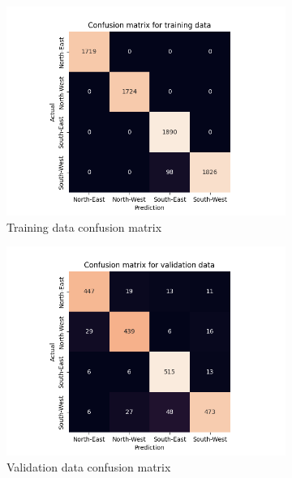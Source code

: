 \documentclass[10pt,twocolumn,letterpaper]{article}
\begin{document}
\begin{figure}[h]
  \centering
  \begin{subfigure}{.33\linewidth}
    \includegraphics[width=\linewidth, trim={7em, 0em, 9em, 5em}, clip]{cnn_aug_cfsn_train}
    \caption{Training data confusion matrix}
    \label{fig:cnn_train}
  \end{subfigure}
  \begin{subfigure}{0.33\linewidth}
    \includegraphics[width=\linewidth, trim={7em, 0em, 9em, 5em}, clip]{cnn_aug_cfsn_valid}
    \caption{Validation data confusion matrix}
    \label{fig:cnn_valid}
  \end{subfigure}
  \begin{subfigure}{0.33\linewidth}

\end{subfigure}
\end{figure}
\end{document}
